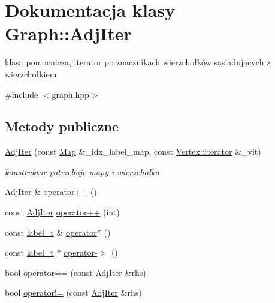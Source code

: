 \hypertarget{classGraph_1_1AdjIter}{\section{Dokumentacja klasy Graph\-:\-:Adj\-Iter}
\label{classGraph_1_1AdjIter}
}


klasa pomocnicza, iterator po znacznikach wierzchołków sąsiadujących z wierzchołkiem  




{\ttfamily \#include $<$graph.\-hpp$>$}

\subsection*{Metody publiczne}
\begin{DoxyCompactItemize}
\item 
\hyperlink{classGraph_1_1AdjIter_aae861e1fb89ed4a5aa252186a6b43f6e}{Adj\-Iter} (const \hyperlink{classGraph_1_1AdjIter_a288bf18f510dc63ed539c9f55919e38b}{Map} \&\-\_\-idx\-\_\-label\-\_\-map, const \hyperlink{classVertex_ac889dee153c9abe7b3fb652ec6583df9}{Vertex\-::iterator} \&\-\_\-vit)
\begin{DoxyCompactList}\small\item\em konstruktor potrzebuje mapy i wierzchołka \end{DoxyCompactList}\item 
\hyperlink{classGraph_1_1AdjIter}{Adj\-Iter} \& \hyperlink{classGraph_1_1AdjIter_aac922624e9e58c1a03740beb049a423c}{operator++} ()
\item 
const \hyperlink{classGraph_1_1AdjIter}{Adj\-Iter} \hyperlink{classGraph_1_1AdjIter_a5afaf8c8b5298f207356ce1979166797}{operator++} (int)
\item 
const \hyperlink{classGraph_a2237a0ada8484c37b8200c0e3685ca71}{label\-\_\-t} \& \hyperlink{classGraph_1_1AdjIter_acc41cdab52336b6ca85fbc74c79ed027}{operator$\ast$} ()
\item 
const \hyperlink{classGraph_a2237a0ada8484c37b8200c0e3685ca71}{label\-\_\-t} $\ast$ \hyperlink{classGraph_1_1AdjIter_a261abb3cb6e6447c061c670d0636dd34}{operator-\/$>$} ()
\item 
bool \hyperlink{classGraph_1_1AdjIter_a2777ef4fb2868c735be23b8354c07364}{operator==} (const \hyperlink{classGraph_1_1AdjIter}{Adj\-Iter} \&rhs)
\item 
bool \hyperlink{classGraph_1_1AdjIter_a7231b79f13eb2b0028debc480c077e6e}{operator!=} (const \hyperlink{classGraph_1_1AdjIter}{Adj\-Iter} \&rhs)
\end{DoxyCompactItemize}
